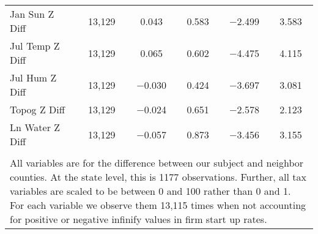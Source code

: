 \begin{table}[!htbp]
\begin{tabular}{@{\extracolsep{5pt}}lccccc}
Jan Sun Z Diff & 13,129 & 0.043 & 0.583 & $-$2.499 & 3.583 \\ 
Jul Temp Z Diff & 13,129 & 0.065 & 0.602 & $-$4.475 & 4.115 \\ 
Jul Hum Z Diff & 13,129 & $-$0.030 & 0.424 & $-$3.697 & 3.081 \\ 
Topog Z Diff & 13,129 & $-$0.024 & 0.651 & $-$2.578 & 2.123 \\ 
Ln Water Z Diff & 13,129 & $-$0.057 & 0.873 & $-$3.456 & 3.155 \\ 
\hline \\[-1.8ex] 
\multicolumn{6}{l}{All variables are for the difference between our subject and neighbor counties. At the state level, this is 1177 observations. Further, all tax variables are scaled to be between 0 and 100 rather than 0 and 1. For each variable we observe them 13,115 times when not accounting for positive or negative infinify values in firm start up rates.} \\ 
\end{tabular} 
\end{table} 
